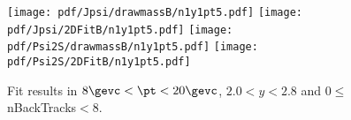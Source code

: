 \begin{figure}[H]
\begin{center}
\texttt{[image: pdf/Jpsi/drawmassB/n1y1pt5.pdf]}
\texttt{[image: pdf/Jpsi/2DFitB/n1y1pt5.pdf]}
\vspace*{-0.5cm}
\texttt{[image: pdf/Psi2S/drawmassB/n1y1pt5.pdf]}
\texttt{[image: pdf/Psi2S/2DFitB/n1y1pt5.pdf]}
\vspace*{-0.5cm}
\end{center}
\caption{Fit results in $8\gevc<\pt<20\gevc$, $2.0<y<2.8$ and 0$\leq$nBackTracks$<$8.}
\label{Fitn1y1pt5}
\end{figure}
